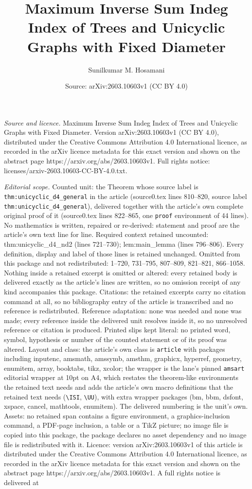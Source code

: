 \documentclass[10pt,a4paper]{amsart}
\title[Maximum Inverse Sum Indeg Index of Trees and Unicyclic Graph]{Maximum Inverse Sum Indeg Index of Trees and Unicyclic Graphs with Fixed Diameter}
\author{Sunilkumar M. Hosamani}
\date{Source: arXiv:2603.10603v1 (CC BY 4.0)}
\begin{document}
\maketitle

\noindent\emph{Source and licence.} Maximum Inverse Sum Indeg Index of Trees and Unicyclic Graphs with Fixed Diameter. Version arXiv:2603.10603v1 (CC BY 4.0), distributed under the Creative Commons Attribution 4.0 International licence, as recorded in the arXiv licence metadata for this exact version and shown on the abstract page https://arxiv.org/abs/2603.10603v1. Full rights notice: licenses/arxiv-2603.10603-CC-BY-4.0.txt.\par\smallskip

\noindent\textit{Editorial scope.} Counted unit: the Theorem whose source label is \texttt{thm:unicyclic\_d4\_general} in the article (source0.tex lines 810--820, source label \texttt{thm:unicyclic\_d4\_general}), delivered together with the article's own complete original proof of it (source0.tex lines 822--865, one \texttt{proof} environment of 44 lines). No mathematics is written, repaired or re-derived: statement and proof are the article's own text line for line. Required context retained uncounted: thm:unicyclic\_d4\_nd2 (lines 721--730); lem:main\_lemma (lines 796--806). Every definition, display and label of those lines is retained unchanged. Omitted from this package and not redistributed: 1--720, 731--795, 807--809, 821--821, 866--1058. Nothing inside a retained excerpt is omitted or altered: every retained body is delivered exactly as the article's lines are written, so no omission receipt of any kind accompanies this package. Citations: the retained excerpts carry no citation command at all, so no bibliography entry of the article is transcribed and no reference is redistributed. Reference adaptation: none was needed and none was made; every reference inside the delivered unit resolves inside it, so no unresolved reference or citation is produced. Printed slips kept literal: no printed word, symbol, hypothesis or number of the counted statement or of its proof was altered. Layout and class: the article's own class is \texttt{article} with packages including inputenc, amsmath, amssymb, amsthm, graphicx, hyperref, geometry, enumitem, array, booktabs, tikz, xcolor; the wrapper is the lane's pinned \texttt{amsart} editorial wrapper at 10pt on A4, which restates the theorem-like environments the retained text needs and adds the article's own macro definitions that the retained text needs (\texttt{\textbackslash ISI}, \texttt{\textbackslash UU}), with extra wrapper packages (bm, bbm, dsfont, xspace, cancel, mathtools, enumitem). The delivered numbering is the unit's own. Assets: no retained span contains a figure environment, a graphics-inclusion command, a PDF-page inclusion, a table or a TikZ picture; no image file is copied into this package, the package declares no asset dependency and no image file is redistributed with it. Licence: version arXiv:2603.10603v1 of this article is distributed under the Creative Commons Attribution 4.0 International licence, as recorded in the arXiv licence metadata for this exact version and shown on the abstract page https://arxiv.org/abs/2603.10603v1. A full rights notice is delivered at 
\end{document}
